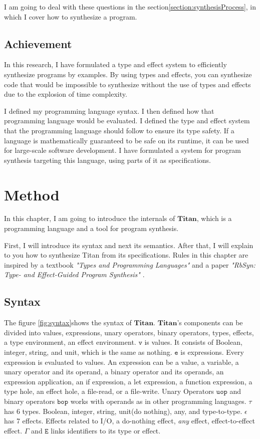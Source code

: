 \documentclass[12pt, a4paper, titlepage]{report}
\begin{document}
    I am going to deal with these questions in the section\ref{section:synthesisProcess}, in which I cover how to synthesize a program.

  \section{Achievement} %
  In this research, I have formulated a type and effect system to efficiently synthesize programs by examples.
  By using types and effects, you can synthesize code that would be impossible to synthesize without the use of types and effects due to the explosion of time complexity.

  I defined my programming language syntax.
  I then defined how that programming language would be evaluated.
  I defined the type and effect system that the programming language should follow to ensure its type safety.
  If a language is mathematically guaranteed to be safe on its runtime, it can be used for large-scale software development.
  I have formulated a system for program synthesis targeting this language, using parts of it as specifications.

\chapter{Method}\label{chapter:method}
  In this chapter, I am going to introduce the internals of $\mathbf{Titan}$, which is a programming language and a tool for program synthesis.

  First, I will introduce its syntax and next its semantics.
  After that, I will explain to you how to synthesize Titan from its specifications.
  Rules in this chapter are inspired by a textbook \emph{"Types and Programming Languages"} \cite{pierce:2002} and a paper \emph{"RbSyn: Type- and Effect-Guided Program Synthesis"} \cite{guria:2021}.
  \section{Syntax}\label{section:syntax}
    The figure \ref{fig:syntax}shows the syntax of $\mathbf{Titan}$.
    $\mathbf{Titan}$'s components can be divided into values, expressions, unary operators, binary operators, types, effects, a type environment, an effect environment.
    $\mathtt{v}$ is values. It consists of Boolean, integer, string, and unit, which is the same as nothing.
    $\mathtt{e}$ is expressions. Every expression is evaluated to values.
    An expression can be a value, a variable, a unary operator and its operand, a binary operator and its operands, an expression application, an if expression, a let expression, a function expression, a type hole, an effect hole, a file-read, or a file-write.
    Unary Operators $\mathtt{uop}$ and binary operators $\mathtt{bop}$ works with operands as in other programming languages.
    $\mathtt{\tau}$ has 6 types. Boolean, integer, string, unit(do nothing), any, and type-to-type.
    $\mathtt{\epsilon}$ has 7 effects. Effects related to I/O, a do-nothing effect, \textit{any} effect, effect-to-effect effect.
    $\mathtt{\Gamma}$ and $\mathtt{E}$ links identifiers to its type or effect.
\end{document}
